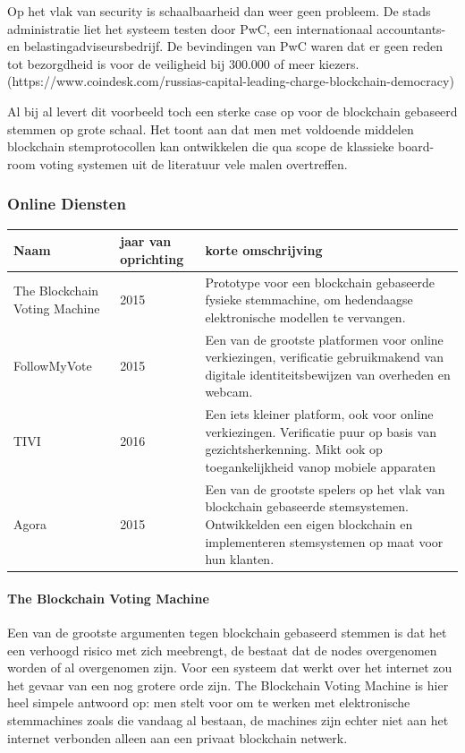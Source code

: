 				Op het vlak van security is schaalbaarheid dan weer geen probleem. De stads administratie liet het systeem testen door PwC, een internationaal accountants- en belastingadviseursbedrijf. De bevindingen van PwC waren dat er geen reden tot bezorgdheid is voor de veiligheid bij  300.000 of meer kiezers. (https://www.coindesk.com/russias-capital-leading-charge-blockchain-democracy)
				
				Al bij al levert dit voorbeeld toch een sterke case op voor de blockchain gebaseerd stemmen op grote schaal. Het toont aan dat men met voldoende middelen blockchain stemprotocollen kan ontwikkelen die qua scope de klassieke board-room voting systemen uit de literatuur vele malen overtreffen. 
			\subsubsection{Online Diensten}
				\begin{center}
					\begin{tabular}{ l | l | p{5cm} }
						\hline
						Naam & jaar van oprichting & korte omschrijving \\ \hline
						The Blockchain Voting Machine  & 2015 & Prototype voor een blockchain gebaseerde fysieke stemmachine, om hedendaagse elektronische modellen te vervangen.\\ \hline
						FollowMyVote & 2015 & Een van de grootste platformen voor online verkiezingen, verificatie gebruikmakend van digitale identiteitsbewijzen van overheden en webcam.\\ \hline
						TIVI & 2016 &  Een iets kleiner platform, ook voor online verkiezingen. Verificatie puur op basis van gezichtsherkenning. Mikt ook op toegankelijkheid vanop mobiele apparaten  \\ \hline
						Agora & 2015 & Een van de grootste spelers op het vlak van blockchain gebaseerde stemsystemen. Ontwikkelden een eigen blockchain en implementeren stemsystemen op maat voor hun klanten. 
					\end{tabular}
				\end{center}
				\paragraph{The Blockchain Voting Machine }
					Een van de grootste argumenten tegen blockchain gebaseerd stemmen is dat het een verhoogd risico met zich meebrengt, de bestaat  dat de nodes overgenomen worden of al overgenomen zijn. Voor een systeem dat werkt over het internet zou het gevaar van een nog grotere orde zijn. The Blockchain Voting Machine is hier heel simpele antwoord op: men stelt voor om te werken met elektronische stemmachines zoals die vandaag al bestaan,   de machines zijn echter niet aan het internet verbonden alleen aan een privaat blockchain netwerk. 
